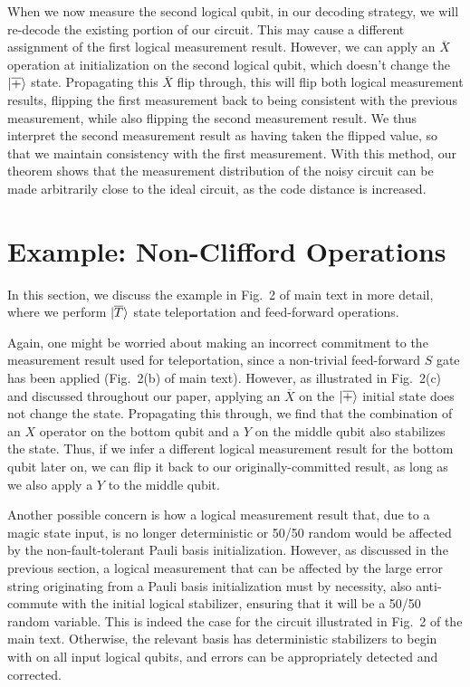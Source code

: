 When we now measure the second logical qubit, in our decoding strategy, we will re-decode the existing portion of our circuit.
%
This may cause a different assignment of the first logical measurement result.
%
However, we can apply an $\overline{X}$ operation at initialization on the second logical qubit, which doesn't change the $|{\overline{+}}\rangle$ state.
%
Propagating this $\overline{X}$ flip through, this will flip both logical measurement results, flipping the first measurement back to being consistent with the previous measurement, while also flipping the second measurement result.
%
We thus interpret the second measurement result as having taken the flipped value, so that we maintain consistency with the first measurement.
%
With this method, our theorem shows that the measurement distribution of the noisy circuit can be made arbitrarily close to the ideal circuit, as the code distance is increased.



\section{Example: Non-Clifford Operations}
\label{si:non_clifford}

In this section, we discuss the example in Fig.~2 of main text in more detail, where we perform $|{\overline{T}}\rangle$ state teleportation and feed-forward operations.

Again, one might be worried about making an incorrect commitment to the measurement result used for teleportation, since a non-trivial feed-forward $S$ gate has been applied (Fig.~2(b) of main text).
%
However, as illustrated in Fig.~2(c) and discussed throughout our paper, applying an $\overline{X}$ on the $|{\overline{+}}\rangle$ initial state does not change the state.
%
Propagating this through, we find that the combination of an $X$ operator on the bottom qubit and a $Y$ on the middle qubit also stabilizes the state.
%
Thus, if we infer a different logical measurement result for the bottom qubit later on, we can flip it back to our originally-committed result, as long as we also apply a $Y$ to the middle qubit.

Another possible concern is how a logical measurement result that, due to a magic state input, is no longer deterministic or 50/50 random would be affected by the non-fault-tolerant Pauli basis initialization.
%
However, as discussed in the previous section, a logical measurement that can be affected by the large error string originating from a Pauli basis initialization must by necessity, also anti-commute with the initial logical stabilizer, ensuring that it will be a 50/50 random variable.
%
This is indeed the case for the circuit illustrated in Fig.~2 of the main text.
%
Otherwise, the relevant basis has deterministic stabilizers to begin with on all input logical qubits, and errors can be appropriately detected and corrected.


